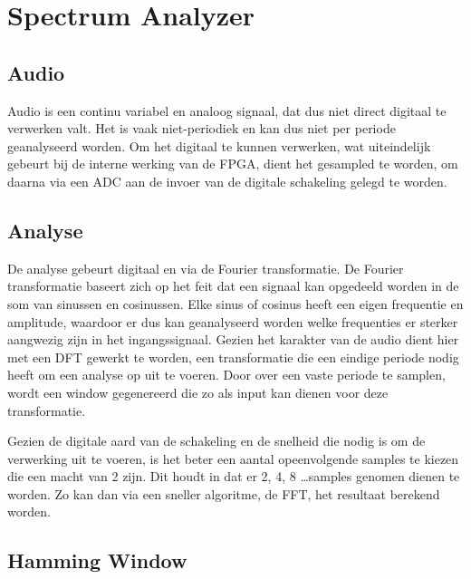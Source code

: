 \chapter{Spectrum Analyzer}

\section{Audio}

	\par Audio is een continu variabel en analoog signaal, dat dus niet direct digitaal te verwerken valt.
	Het is vaak niet-periodiek en kan dus niet per periode geanalyseerd worden.
	Om het digitaal te kunnen verwerken, wat uiteindelijk gebeurt bij de interne werking van de FPGA, dient het gesampled te worden, om daarna via een ADC aan de invoer van de digitale schakeling gelegd te worden.

\section{Analyse}

	\par De analyse gebeurt digitaal en via de Fourier transformatie. De Fourier transformatie baseert zich op het feit dat een signaal kan opgedeeld worden in de som van sinussen en cosinussen. Elke sinus of cosinus heeft een eigen frequentie en amplitude, waardoor er dus kan geanalyseerd worden welke frequenties er sterker aangwezig zijn in het ingangssignaal. Gezien het karakter van de audio dient hier met een DFT gewerkt te worden, een transformatie die een eindige periode nodig heeft om een analyse op uit te voeren. Door over een vaste periode te samplen, wordt een window gegenereerd die zo als input kan dienen voor deze transformatie.
	
	\par Gezien de digitale aard van de schakeling en de snelheid die nodig is om de verwerking uit te voeren, is het beter een aantal opeenvolgende samples te kiezen die een macht van 2 zijn. Dit houdt in dat er 2, 4, 8 \ldots samples genomen dienen te worden. Zo kan dan via een sneller algoritme, de FFT, het resultaat berekend worden.

\section{Hamming Window}

